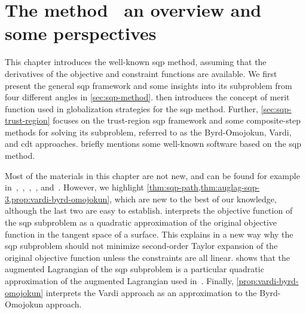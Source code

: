 %
%
%
\chapter{The  method \textemdash\ an overview and some perspectives}
\label{ch:sqp}

This chapter introduces the well-known \gls{sqp} method, assuming that the derivatives of the objective and constraint functions are available.
We first present the general \gls{sqp} framework and some insights into its subproblem from four different angles in \cref{sec:sqp-method}.
 then introduces the concept of merit function used in globalization strategies for the \gls{sqp} method.
Further, \cref{sec:sqp-trust-region} focuses on the trust-region \gls{sqp} framework and some composite-step methods for solving its subproblem, referred to as the Byrd-Omojokun, Vardi, and \gls{cdt} approaches.
 briefly mentions some well-known software based on the \gls{sqp} method.

Most of the materials in this chapter are not new, and can be found for example in~\cite{Boggs_Tolle_1995,Gould_Toint_2000},~\cite[Ch.~15]{Conn_Gould_Toint_2000},~\cite[Ch.~12]{Sun_Yuan_2006},~\cite[Ch.~18]{Nocedal_Wright_2006}, and~\cite{Schittkowski_Yuan_2011,Gill_Wong_2011}.
However, we highlight \cref{thm:sqp-path,thm:auglag-sqp-3,prop:vardi-byrd-omojokun}, which are new to the best of our knowledge, although the last two are easy to establish.
 interprets the objective function of the \gls{sqp} subproblem as a quadratic approximation of the original objective function in the tangent space of a surface.
This explains in a new way why the \gls{sqp} subproblem should not minimize second-order Taylor expansion of the original objective function unless the constraints are all linear.
 shows that the augmented Lagrangian of the \gls{sqp} subproblem is a particular quadratic approximation of the augmented Lagrangian used in~\cite{Niu_Yuan_2010,Wang_Yuan_2014}.
Finally, \cref{prop:vardi-byrd-omojokun} interprets the Vardi approach as an approximation to the Byrd-Omojokun approach.

